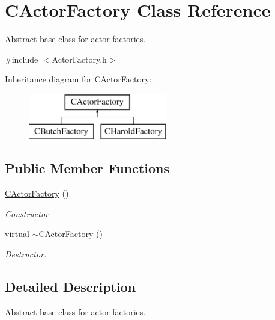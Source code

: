 \hypertarget{class_c_actor_factory}{\section{C\+Actor\+Factory Class Reference}
\label{class_c_actor_factory}
}


Abstract base class for actor factories.  




{\ttfamily \#include $<$Actor\+Factory.\+h$>$}

Inheritance diagram for C\+Actor\+Factory\+:\begin{figure}[H]
\begin{center}
\leavevmode
\includegraphics[height=2.000000cm]{class_c_actor_factory}
\end{center}
\end{figure}
\subsection*{Public Member Functions}
\begin{DoxyCompactItemize}
\item 
\hypertarget{class_c_actor_factory_a6a9d84ffa74ef0b01bf1e31fb28efcaa}{\hyperlink{class_c_actor_factory_a6a9d84ffa74ef0b01bf1e31fb28efcaa}{C\+Actor\+Factory} ()}\label{class_c_actor_factory_a6a9d84ffa74ef0b01bf1e31fb28efcaa}

\begin{DoxyCompactList}\small\item\em Constructor. \end{DoxyCompactList}\item 
virtual \hyperlink{class_c_actor_factory_a2c3174c6ca0362dbd3dbd2f599a51c46}{$\sim$\+C\+Actor\+Factory} ()
\begin{DoxyCompactList}\small\item\em Destructor. \end{DoxyCompactList}\end{DoxyCompactItemize}


\subsection{Detailed Description}
Abstract base class for actor factories. 

